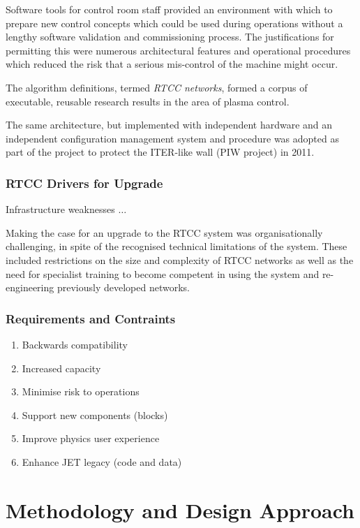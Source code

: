\documentclass[preprint,12pt]{elsarticle}
\begin{document}
Software tools for control room staff provided an environment with
which to prepare new control concepts which could be used during operations
without a lengthy software validation and commissioning process.
The justifications for permitting this were numerous architectural
features and operational procedures which reduced the risk that a 
serious mis-control of the machine might occur.

The algorithm definitions, termed {\em RTCC networks}, formed a corpus
of executable, reusable research results in the area of plasma control.

The same architecture, but implemented with independent hardware
and an independent configuration management system and procedure 
was adopted as part of the project to protect the ITER-like wall
(PIW project) in 2011.

\subsubsection{RTCC Drivers for Upgrade}

Infrastructure weaknesses $\ldots$

Making the case for an upgrade to the RTCC system was organisationally
challenging, in spite of the recognised technical limitations of the system.
These included restrictions on the size and complexity of RTCC networks
as well as the need for specialist training to become competent in
using the system and re-engineering previously developed networks.

\subsubsection{Requirements and Contraints}


\begin{enumerate}
	\item{Backwards compatibility}
	\item{Increased capacity}
	\item{Minimise risk to operations}
	\item{Support new components (blocks)}
	\item{Improve physics user experience}
	\item{Enhance JET legacy (code and data)}
\end{enumerate}

\section{Methodology and Design Approach}
\end{document}
